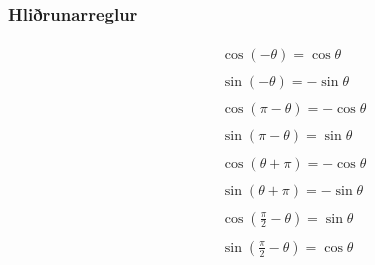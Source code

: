 \documentclass[a4paper,10pt,icelandic]{sphinxmanual}
\begin{document}
\subsubsection{Hliðrunarreglur}
\label{\detokenize{Kafli12:hlirunarreglur}}\begin{equation*}
\begin{split}\begin{aligned}
    & \qquad \cos(-\theta)=\cos \theta\\
    \qquad \\
& \qquad \sin(-\theta)=-\sin\theta\\
    \qquad \\
& \qquad \cos(\pi-\theta)=-\cos \theta\\
    \qquad \\
& \qquad \sin(\pi-\theta)=\sin \theta\\
    \qquad \\
& \qquad \cos(\theta+\pi)=-\cos \theta\\
    \qquad \\
    & \qquad \sin(\theta+\pi)=-\sin \theta\\
    \qquad \\
    & \qquad \cos\left(\frac{\pi}{2}-\theta\right)=\sin\theta\\
    \qquad \\
    & \qquad \sin\left(\frac{\pi}{2}-\theta\right)=\cos\theta
    \end{aligned}\end{split}
\end{equation*}
\end{document}

